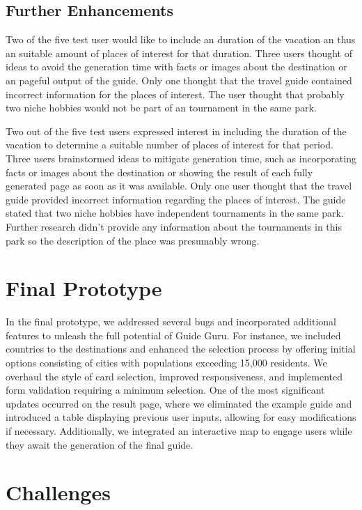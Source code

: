 \documentclass[english,notitlepage,smartquotes]{hgbreport}
\begin{document}
\subsection{Further Enhancements}
Two of the five test user would like to include an duration of the vacation an thus an suitable amount of places of interest for that duration. Three users thought of ideas to avoid the generation time with facts or images about the destination or an pageful output of the guide. Only one thought that the travel guide contained incorrect information for the places of interest. The user thought that probably two niche hobbies would not be part of an tournament in the same park.

Two out of the five test users expressed interest in including the duration of the vacation to determine a suitable number of places of interest for that period. Three users brainstormed ideas to mitigate generation time, such as incorporating facts or images about the destination or showing the result of each fully generated page as soon as it was available. Only one user thought that the travel guide provided incorrect information regarding the places of interest. The guide stated that two niche hobbies have independent tournaments in the same park. Further research didn't provide any information about the tournaments in this park so the description of the place was presumably wrong.

\section{Final Prototype}

In the final prototype, we addressed several bugs and incorporated additional features to unleash the full potential of Guide Guru. For instance, we included countries to the destinations and enhanced the selection process by offering initial options consisting of cities with populations exceeding 15,000 residents. We overhaul the style of card selection, improved responsiveness, and implemented form validation requiring a minimum selection. One of the most significant updates occurred on the result page, where we eliminated the example guide and introduced a table displaying previous user inputs, allowing for easy modifications if necessary. Additionally, we integrated an interactive map to engage users while they await the generation of the final guide.
 
\section{Challenges} \label{Challenges}
\end{document}
